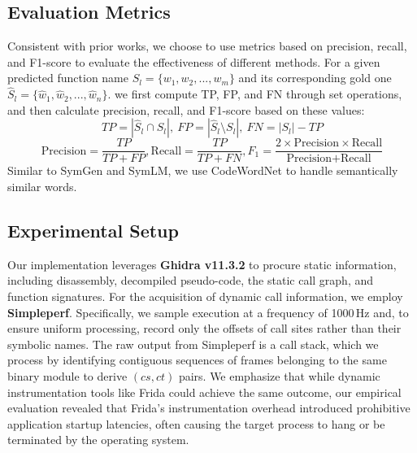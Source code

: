 \documentclass[acmsmall,screen,review,anonymous]{acmart} %
\begin{document}



\subsection{Evaluation Metrics}
Consistent with prior works\cite{NFRE, NERO, SimLLM, SymGen}, we choose to use metrics based on precision, recall, and F1-score to evaluate the effectiveness of different methods. For a given predicted function name $S_l = \{w_1, w_2, ..., w_m\}$ and its corresponding gold one $\hat{S}_l = \{\hat{w}_1, \hat{w}_2, ..., \hat{w}_n\}$. we first compute TP, FP, and FN through set operations, and then calculate precision, recall, and F1-score based on these values:
$$
TP = |\hat{S}_l \cap S_l|, \ FP = |\hat{S}_l \setminus S_l|, \ FN = |S_l| - TP
$$
$$
\text{Precision} = \frac{TP}{TP + FP}, \text{Recall} = \frac{TP}{TP + FN}, F_{1} = \frac{2 \times \text{Precision} \times \text{Recall}}{\text{Precision} + \text{Recall}}
$$
Similar to SymGen\cite{SymGen} and SymLM\cite{SymLM}, we use CodeWordNet to handle semantically similar words.


\subsection{Experimental Setup}
Our implementation leverages \textbf{Ghidra v11.3.2} to procure static information, including disassembly, decompiled pseudo-code, the static call graph, and function signatures. For the acquisition of dynamic call information, we employ \textbf{Simpleperf}. Specifically, we sample execution at a frequency of 1000\,Hz and, to ensure uniform processing, record only the offsets of call sites rather than their symbolic names. The raw output from Simpleperf is a call stack, which we process by identifying contiguous sequences of frames belonging to the same binary module to derive \((cs, ct)\) pairs. We emphasize that while dynamic instrumentation tools like Frida could achieve the same outcome, our empirical evaluation revealed that Frida's instrumentation overhead introduced prohibitive application startup latencies, often causing the target process to hang or be terminated by the operating system.
\end{document}
